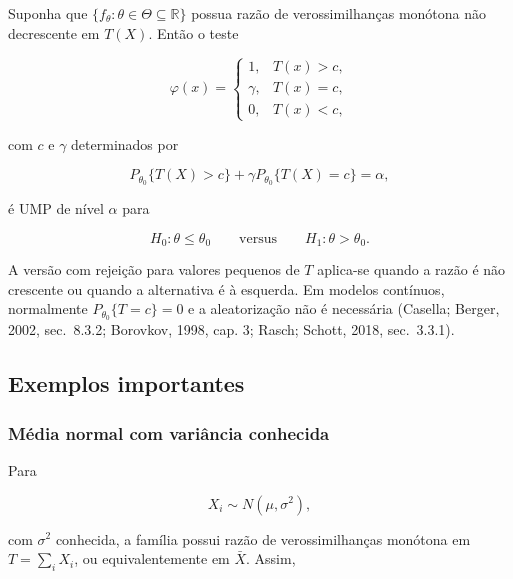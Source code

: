 \documentclass[
  letterpaper,
  DIV=11,
  numbers=noendperiod]{scrreprt}
\begin{document}
\begin{tcolorbox}[enhanced jigsaw, colback=white, leftrule=.75mm, colbacktitle=quarto-callout-tip-color!10!white, breakable, titlerule=0mm, bottomtitle=1mm, title=\textcolor{quarto-callout-tip-color}{\faLightbulb}\hspace{0.5em}{Teorema: resultado de Karlin--Rubin}, colframe=quarto-callout-tip-color-frame, toprule=.15mm, opacityback=0, bottomrule=.15mm, opacitybacktitle=0.6, arc=.35mm, toptitle=1mm, rightrule=.15mm, coltitle=black, left=2mm]

Suponha que \(\{f_\theta:\theta\in\Theta\subseteq\mathbb{R}\}\) possua
razão de verossimilhanças monótona não decrescente em \(T(X)\). Então o
teste

\[\varphi(x)=
\begin{cases}
1, & T(x)>c,\\
\gamma, & T(x)=c,\\
0, & T(x)<c,
\end{cases}\]

com \(c\) e \(\gamma\) determinados por

\[P_{\theta_0}\{T(X)>c\}
+\gamma P_{\theta_0}\{T(X)=c\}
=\alpha,\]

é UMP de nível \(\alpha\) para

\[H_0:\theta\leq\theta_0
\qquad\text{versus}\qquad
H_1:\theta>\theta_0.\]

A versão com rejeição para valores pequenos de \(T\) aplica-se quando a
razão é não crescente ou quando a alternativa é à esquerda. Em modelos
contínuos, normalmente \(P_{\theta_0}\{T=c\}=0\) e a aleatorização não é
necessária (Casella; Berger, 2002, sec.~8.3.2; Borovkov, 1998, cap. 3;
Rasch; Schott, 2018, sec.~3.3.1).

\end{tcolorbox}

\subsection{Exemplos importantes}\label{exemplos-importantes}

\subsubsection{Média normal com variância
conhecida}\label{muxe9dia-normal-com-variuxe2ncia-conhecida}

Para

\[X_i\sim N(\mu,\sigma^2),\]

com \(\sigma^2\) conhecida, a família possui razão de verossimilhanças
monótona em \(T=\sum_iX_i\), ou equivalentemente em \(\bar{X}\). Assim,
\end{document}
